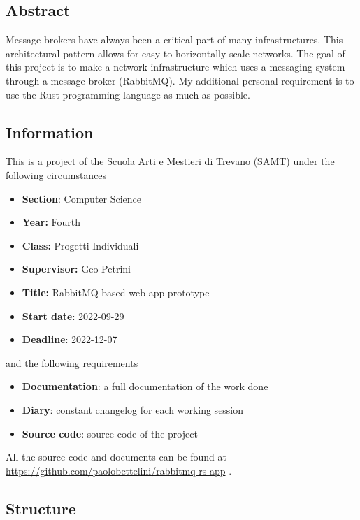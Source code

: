 \documentclass[../documentation.tex]{subfiles}
\begin{document}
\subsection{Abstract}

Message brokers have always been a critical part of many infrastructures.
This architectural pattern allows for easy to horizontally scale networks.
The goal of this project is to make a network infrastructure
which uses a messaging system through a message broker (RabbitMQ\cite{rabbitmq}).
My additional personal requirement is to use the Rust programming language\cite{rust}
as much as possible.

\subsection{Information}

This is a project of the Scuola Arti e Mestieri di Trevano (SAMT) under the following circumstances

\begin{itemize}
    \item \textbf{Section}: Computer Science
    \item \textbf{Year:} Fourth
    \item \textbf{Class:} Progetti Individuali
    \item \textbf{Supervisor:} Geo Petrini
    \item \textbf{Title:} RabbitMQ based web app prototype
    \item \textbf{Start date}: 2022-09-29
    \item \textbf{Deadline}: 2022-12-07
\end{itemize}

and the following requirements

\begin{itemize}
    \item \textbf{Documentation}: a full documentation of the work done
    \item \textbf{Diary}: constant changelog for each working session
    \item \textbf{Source code}: source code of the project
\end{itemize}

All the source code and documents can be found at
\href{https://github.com/paolobettelini/rabbitmq-rs-app}
{https://github.com/paolobettelini/rabbitmq-rs-app}
\cite{gitrepo}.

\subsection{Structure}
\end{document}
